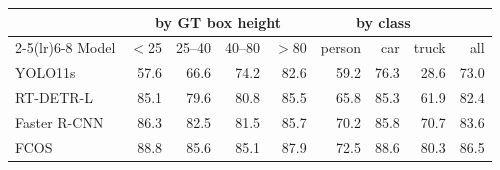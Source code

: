 \begin{tabular}{lrrrrrrrr}
\toprule
 & \multicolumn{4}{c}{by GT box height} & \multicolumn{3}{c}{by class} & \\
\cmidrule(lr){2-5}\cmidrule(lr){6-8}
Model & $<$25 & 25--40 & 40--80 & $>$80 & person & car & truck & all \\
\midrule
YOLO11s & 57.6 & 66.6 & 74.2 & 82.6 & 59.2 & 76.3 & 28.6 & 73.0 \\
RT-DETR-L & 85.1 & 79.6 & 80.8 & 85.5 & 65.8 & 85.3 & 61.9 & 82.4 \\
Faster R-CNN & 86.3 & 82.5 & 81.5 & 85.7 & 70.2 & 85.8 & 70.7 & 83.6 \\
FCOS & 88.8 & 85.6 & 85.1 & 87.9 & 72.5 & 88.6 & 80.3 & 86.5 \\
\bottomrule
\end{tabular}
